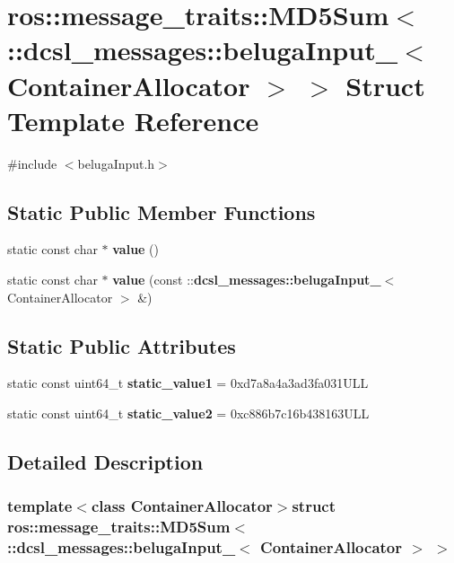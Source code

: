 \section{ros\-:\-:message\-\_\-traits\-:\-:\-M\-D5\-Sum$<$ \-:\-:dcsl\-\_\-messages\-:\-:beluga\-Input\-\_\-$<$ \-Container\-Allocator $>$ $>$ \-Struct \-Template \-Reference}
\label{structros_1_1message__traits_1_1MD5Sum_3_01_1_1dcsl__messages_1_1belugaInput___3_01ContainerAllocator_01_4_01_4}


{\ttfamily \#include $<$beluga\-Input.\-h$>$}

\subsection*{\-Static \-Public \-Member \-Functions}
\begin{DoxyCompactItemize}
\item 
static const char $\ast$ {\bf value} ()
\item 
static const char $\ast$ {\bf value} (const \-::{\bf dcsl\-\_\-messages\-::beluga\-Input\-\_\-}$<$ \-Container\-Allocator $>$ \&)
\end{DoxyCompactItemize}
\subsection*{\-Static \-Public \-Attributes}
\begin{DoxyCompactItemize}
\item 
static const uint64\-\_\-t {\bf static\-\_\-value1} = 0xd7a8a4a3ad3fa031\-U\-L\-L
\item 
static const uint64\-\_\-t {\bf static\-\_\-value2} = 0xc886b7c16b438163\-U\-L\-L
\end{DoxyCompactItemize}


\subsection{\-Detailed \-Description}
\subsubsection*{template$<$class Container\-Allocator$>$struct ros\-::message\-\_\-traits\-::\-M\-D5\-Sum$<$ \-::dcsl\-\_\-messages\-::beluga\-Input\-\_\-$<$ Container\-Allocator $>$ $>$}



